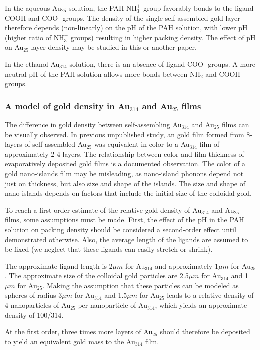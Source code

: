 \documentclass[12pt,oneside,english]{article}
\begin{document}
	In the aqueous Au$_{25}$ solution, the PAH NH$_3^+$ group favorably bonds to the ligand COOH and COO- groups.
	The density of the single self-assembled gold layer therefore depends (non-linearly) on the pH of the PAH solution, with lower pH (higher ratio of NH$_3^+$ groups) resulting in higher packing density.
	The effect of pH on Au$_{25}$ layer density may be studied in this or another paper.
	
	In the ethanol Au$_{314}$ solution, there is an absence of ligand COO- groups.
	A more neutral pH of the PAH solution allows more bonds between NH$_2$ and COOH groups.
	
	\subsubsection{A model of gold density in Au$_{314}$ and Au$_{25}$ films}
	The difference in gold density between self-assembling Au$_{314}$ and Au$_{25}$ films can be visually observed.
	In previous unpublished study, an gold film formed from 8-layers of self-assembled Au$_{25}$ was equivalent in color to a Au$_{314}$ film of approximately 2-4 layers.
	The relationship between color and film thickness of evaporatively deposited gold films is a documented observation.
	The color of a gold nano-islands film may be misleading, as nano-island phonons depend not just on thickness, but also size and shape of the islands.
	The size and shape of nano-islands depends on factors that include the initial size of the colloidal gold.
	
	To reach a first-order estimate of the relative gold density of Au$_{314}$ and Au$_{25}$ films, some assumptions must be made.
	First, the effect of the pH in the PAH solution on packing density should be considered a second-order effect until demonstrated otherwise.
	Also, the average length of the ligands are assumed to be fixed (we neglect that these ligands can easily stretch or shrink).
	
	The approximate ligand length is 2${\mu}m$ for Au$_{314}$ and approximately 1${\mu}m$ for Au$_{25}$.
	The approximate size of the colloidal gold particles are 2.5${\mu}m$ for Au$_{314}$ and 1${\mu}m$ for Au$_{25}$.
	Making the assumption that these particles can be modeled as spheres of radius 3${\mu}m$ for Au$_{314}$ and 1.5${\mu}m$ for Au$_{25}$ leads to a relative density of 4 nanoparticles of Au$_{25}$ per nanoparticle of Au$_{314}$, which yields an approximate density of 100/314.
	
	At the first order, three times more layers of Au$_{25}$ should therefore be deposited to yield an equivalent gold mass to the Au$_{314}$ film.
	
\end{document}
